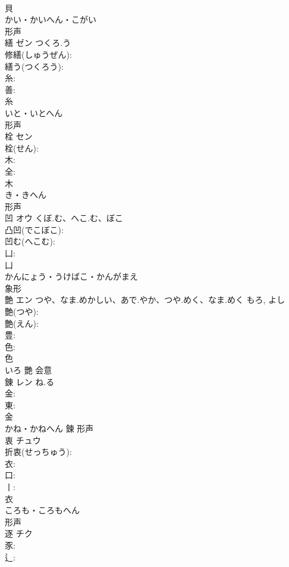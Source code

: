 \documentclass[8pt]{extreport}
\begin{document}
\begin{CJK}{UTF8}{min}
\\	貝	
\\	かい・かいへん・こがい	
\\	形声 
\\	繕	ゼン	つくろ.う		
\\	修繕(しゅうぜん): 
\\	繕う(つくろう): 
\\	糸: 
\\	善: 
\\	糸	
\\	いと・いとへん	
\\	形声 
\\	栓	セン			
\\	栓(せん): 
\\	木: 
\\	全: 
\\	木	
\\	き・きへん	
\\	形声 
\\	凹	オウ	くぼ.む、へこ.む、ぼこ		
\\	凸凹(でこぼこ): 
\\	凹む(へこむ): 
\\	凵: 
\\	凵	
\\	かんにょう・うけばこ・かんがまえ	
\\	象形 
\\	艶	エン	つや、なま.めかしい、あで.やか、つや.めく、なま.めく	もろ, よし	
\\	艶(つや): 
\\	艶(えん): 
\\	豊: 
\\	色: 
\\	色	
\\	いろ	艷	会意 
\\	錬	レン	ね.る		
\\	金: 
\\	東: 
\\	金	
\\	かね・かねへん	鍊	形声 
\\	衷	チュウ			
\\	折衷(せっちゅう): 
\\	衣: 
\\	口: 
\\	丨: 
\\	衣	
\\	ころも・ころもへん	
\\	形声 
\\	逐	チク			
\\	豕: 
\\	辶: 

\end{CJK}
\end{document}
